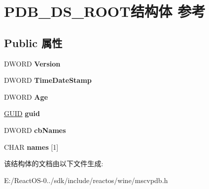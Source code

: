 \hypertarget{struct_p_d_b___d_s___r_o_o_t}{}\section{P\+D\+B\+\_\+\+D\+S\+\_\+\+R\+O\+O\+T结构体 参考}
\label{struct_p_d_b___d_s___r_o_o_t}
\subsection*{Public 属性}
\begin{DoxyCompactItemize}
\item 
\mbox{\label{struct_p_d_b___d_s___r_o_o_t_a1fdec5ee9903a78e84ea00f0aa020931}} 
D\+W\+O\+RD {\bfseries Version}
\item 
\mbox{\label{struct_p_d_b___d_s___r_o_o_t_af147244445a59080723126105b9bb57e}} 
D\+W\+O\+RD {\bfseries Time\+Date\+Stamp}
\item 
\mbox{\label{struct_p_d_b___d_s___r_o_o_t_a4b241289882cffa41f96c70f43b99b60}} 
D\+W\+O\+RD {\bfseries Age}
\item 
\mbox{\label{struct_p_d_b___d_s___r_o_o_t_a7e7a3fe556670b0ba655b6a588e07f6c}} 
\hyperlink{interface_g_u_i_d}{G\+U\+ID} {\bfseries guid}
\item 
\mbox{\label{struct_p_d_b___d_s___r_o_o_t_ae8cdaf3287efa4488e8561225bc54f16}} 
D\+W\+O\+RD {\bfseries cb\+Names}
\item 
\mbox{\label{struct_p_d_b___d_s___r_o_o_t_adf13acd31e3d48d9471832914de01dba}} 
C\+H\+AR {\bfseries names} \mbox{[}1\mbox{]}
\end{DoxyCompactItemize}


该结构体的文档由以下文件生成\+:\begin{DoxyCompactItemize}
\item 
E\+:/\+React\+O\+S-\/0../sdk/include/reactos/wine/mscvpdb.\+h\end{DoxyCompactItemize}
